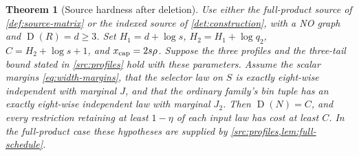\documentclass[11pt]{article} \usepackage[utf8]{inputenc}
\theoremstyle{plain} \newtheorem{theorem}{Theorem}[section]
\theoremstyle{definition} \newaliascnt{definition}{theorem}
\newcommand{\D}{\operatorname{D}}
\begin{document}
\begin{theorem}[Source hardness after deletion]\label{src:near-full}
Use either the full-product source of \cref{def:source-matrix} or the
indexed source of \cref{det:construction}, with a NO graph and
$\D(R)=d\ge3$. Set $H_1=d+\log s$, $H_2=H_1+\log q_2$,
$C=H_2+\log s+1$, and $x_{\rm cap}=2s\rho$.
Suppose the three profiles and the three-tail bound stated in
\cref{src:profiles} hold with these parameters. Assume the scalar margins
\eqref{eq:width-margins}, that the selector law on $S$ is exactly eight-wise
independent with marginal $J$, and that the ordinary family's bin tuple has
an exactly eight-wise independent law with marginal $J_2$.
Then $\D(N)=C$, and every restriction retaining at least $1-\eta$ of each
input law has cost at least $C$. In the full-product case these hypotheses
are supplied by \cref{src:profiles,lem:full-schedule}.
\end{theorem}
\end{document}
